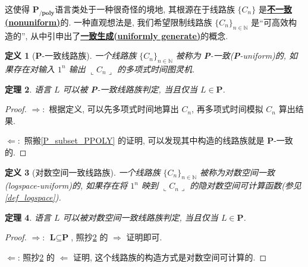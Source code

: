 \documentclass[8pt]{article}
\theoremstyle{compact}
\newtheorem{theorem}{定理}[section]
\newtheorem{definition}[theorem]{定义}
\def\obj#1{\textbf{\uline{#1}}}
\def\rep#1{\llcorner{#1}\lrcorner}
\def\P{\textbf{P}}
\def\L{\textbf{L}}
\def\PPOLY{$\textbf{P}_{\textbf{/poly}}$}
\begin{document}
这使得 \PPOLY 语言类处于一种很奇怪的境地, 其根源在于线路族 $\{C_n\}$ 是\obj{不一致(nonuniform)}的. 一种直观想法是, 我们希望限制线路族 $\{C_n\}_{n \in \mathbb N}$ 是“可高效构造的”, 从中引申出了\obj{一致生成(uniformly generate)}的概念.

\begin{definition}[\P-一致线路族]
	一个线路族 $\{C_n\}_{n \in \mathbb N}$ 被称为 \P-一致(\P-uniform)的, 如果存在对输入 $1^n$ 输出 $\rep{C_n}$ 的多项式时间图灵机.
\end{definition}
\begin{theorem}
	语言 $L$ 可以被 \P-一致线路族判定, 当且仅当 $L \in \P$.
	\label{P-uniform}
\end{theorem}
\begin{proof}
	$\Rightarrow: $ 根据定义, 可以先多项式时间地算出 $C_n$, 再多项式时间模拟 $C_n$ 算出结果.
	
	$\Leftarrow: $ 照搬\cref{P_subset_PPOLY} 的证明, 可以发现其中构造的线路族就是 \P-一致的.
\end{proof}
\begin{definition}[对数空间一致线路族]
	一个线路族 $\{C_n\}_{n \in \mathbb N}$ 被称为对数空间一致(logspace-uniform)的, 如果存在将 $1^n$ 映到 $\rep{C_n}$ 的隐对数空间可计算函数(参见\cref{def_logspace}).
\end{definition}
\begin{theorem}
	语言 $L$ 可以被对数空间一致线路族判定, 当且仅当 $L \in \P$.
\end{theorem}
\begin{proof}
	$\Rightarrow$: $\L \subseteq \P$, 照抄\cref{P-uniform} 的 $\Rightarrow$ 证明即可.

	$\Leftarrow$: 照抄\cref{P-uniform} 的 $\Leftarrow$ 证明, 这个线路族的构造方式是对数空间可计算的.
\end{proof}
\end{document}
